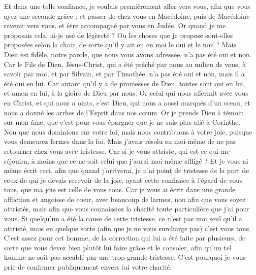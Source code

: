 \begin{multicols}{2}
Et dans une telle confiance, je voulais premièrement aller vers vous, afin que vous ayez une seconde grâce ;
et passer de chez vous en Macédoine, puis de Macédoine revenir vers vous, et être accompagné par vous en Judée.
Or quand je me proposais cela, ai-je usé de légèreté ? Ou les choses que je propose sont-elles proposées selon la chair, de sorte qu'il y ait eu en moi le oui et le non ?
Mais Dieu est fidèle, notre parole, que nous vous avons adressée, n'a pas été oui et non.
Car le Fils de Dieu, Jésus-Christ, qui a été prêché par nous au milieu de vous, à savoir par moi, et par Silvain, et par Timothée, n'a pas été oui et non, mais il a été oui en lui.
Car autant qu'il y a de promesses de Dieu, toutes sont oui en lui, et amen en lui, à la gloire de Dieu par nous.
Or celui qui nous affermit avec vous en Christ, et qui nous a oints, c'est Dieu,
qui nous a aussi marqués d'un sceau, et nous a donné les arrhes de l'Esprit dans nos cœurs.
Or je prends Dieu à témoin sur mon âme, que c'est pour vous épargner que je ne suis plus allé à Corinthe.
Non que nous dominions sur votre foi, mais nous contribuons à votre joie, puisque vous demeurez fermes dans la foi.
\VerseOne{}Mais j'avais résolu en moi-même de ne pas retourner chez vous avec tristesse.
Car si je vous attriste, qui est-ce qui me réjouira, à moins que ce ne soit celui que j'aurai moi-même affligé ?
Et je vous ai même écrit ceci, afin que quand j'arriverai, je n'ai point de tristesse de la part de ceux de qui je devais recevoir de la joie, ayant cette confiance à l'égard de vous tous, que ma joie est celle de vous tous.
Car je vous ai écrit dans une grande affliction et angoisse de cœur, avec beaucoup de larmes, non afin que vous soyez attristés, mais afin que vous connaissiez la charité toute particulière que j'ai pour vous.
Si quelqu'un a été la cause de cette tristesse, ce n'est pas moi seul qu'il a attristé, mais en quelque sorte (afin que je ne vous surcharge pas) c'est vous tous.
C'est assez pour cet homme, de la correction qui lui a été faite par plusieurs,
de sorte que vous devez bien plutôt lui faire grâce et le consoler, afin qu'un tel homme ne soit pas accablé par une trop grande tristesse.
C'est pourquoi je vous prie de confirmer publiquement envers lui votre charité.

\end{multicols}
